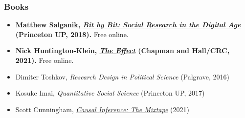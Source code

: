 \begin{frame}
\frametitle{Books}
\centering

\small
\begin{itemize}
  \item \textbf{Matthew Salganik, \href{https://www.bitbybitbook.com/}{\textit{Bit by Bit: Social Research in the Digital Age}} (Princeton UP, 2018).} Free online. 
  \item \textbf{Nick Huntington-Klein, \href{https://theeffectbook.net/}{\textit{The Effect}} (Chapman and Hall/CRC, 2021).} Free online. 
  \item Dimiter Toshkov, \textit{Research Design in Political Science} (Palgrave, 2016)
  \vspace{8pt}
  \item Kosuke Imai, \textit{Quantitative Social Science} (Princeton UP, 2017) \hfill {}
  \item Scott Cunningham, \href{https://mixtape.scunning.com/}{\textit{Causal Inference: The Mixtape}} (2021) \hfill {}
\end{itemize}

\end{frame}

